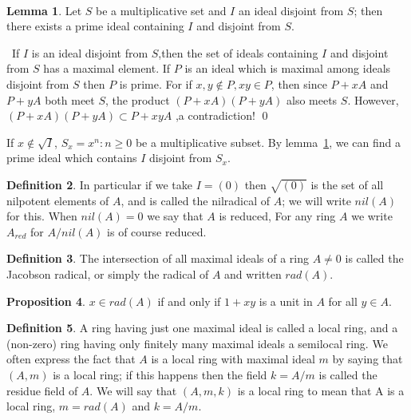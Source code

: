 \documentclass[a4paper,12pt]{article}
\newenvironment{prooff}{{\noindent\it\textcolor{cyan!40!black}{Proof}:}\,}{\par}
\newenvironment{proofff}{{\noindent\it\textcolor{cyan!40!black}{Proof of the lemma}:}\,}{\qed \par}
\theoremstyle{definition}
\newtheorem{defn}{Definition}[subsection]
\newtheorem{lem}[defn]{Lemma}
\newtheorem{prop}[defn]{Proposition}
\begin{document}
\begin{prooff}
    \begin{lem}
        Let $S$ be a multiplicative set and $I$ an ideal disjoint from $S$;
        then there exists a prime ideal containing $I$ and disjoint from $S$.
        \label{lemma:multiplicative set,prime ideal}
    \end{lem}
    \begin{proofff}
        If $I$ is an ideal disjoint from $S$,then the set of ideals containing $I$ and disjoint from $S$ has a maximal
        element. If $P$ is an ideal which is maximal among ideals disjoint from $S$
        then $P$ is prime. For if $x,y\notin P,xy\in P$, then since $P+xA$ and $P+yA$ both
        meet $S$, the product $(P + xA) (P + y A)$ also meets $S$. However,
        $(P + xA) (P + y A) \subset P+xyA$ ,a contradiction!
    \end{proofff}
    If $x\notin \sqrt{I}$, $S_x={x^n:n\ge 0}$ be a multiplicative subset. By lemma~\ref{lemma:multiplicative set,prime ideal}, we can find
    a prime ideal which contains $I$ disjoint from $S_x$.
\end{prooff}
\begin{defn}
    In particular if we take $I = (0)$ then $\sqrt{(0)}$ is the set of all nilpotent elements
    of $A$, and is called the nilradical of $A$; we will write $nil(A)$ for this. When $nil(A) = 0$ we say
    that $A$ is reduced, For any ring $A$ we write $A_{red}$ for $A/nil(A)$ is of course reduced.
\end{defn}
\begin{defn}
    The intersection of all maximal ideals of a ring $A\neq 0$ is called the
    Jacobson radical, or simply the radical of $A$ and written $rad(A)$.
\end{defn}
\begin{prop}
    $x\in rad(A)$ if and only if $1+xy$ is a unit in $A$ for all $y\in A$.
    \label{proposition:Jacobson radical}
\end{prop}
\begin{defn}
    A ring having just one maximal ideal is called a local ring, and a
    (non-zero) ring having only finitely many maximal ideals a semilocal ring.
    We often express the fact that $A$ is a local ring with maximal ideal $m$ by
    saying that $(A, m)$ is a local ring; if this happens then the field $k = A/m$ is
    called the residue field of $A$. We will say that $(A,m,k)$ is a local ring to
    mean that A is a local ring, $m = rad(A)$ and $k = A/m$.
\end{defn}
\end{document}
